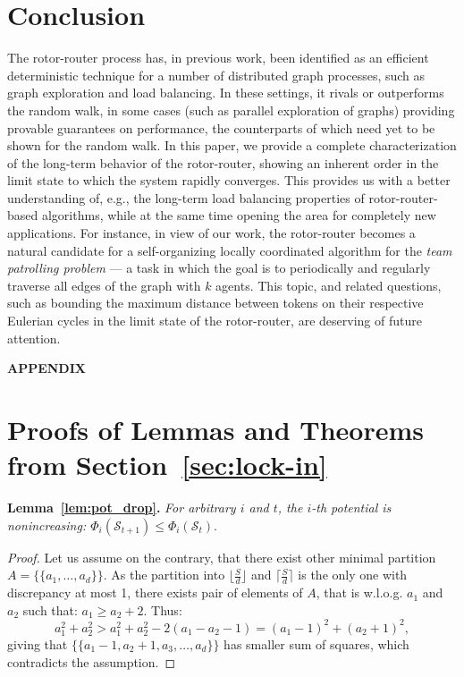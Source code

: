 \documentclass{article}[11pt,letter]
\newcommand{\state}{\mathcal{S}}
\newcommand{\mset}[1]{\{\!\{#1\}\!\}}
\begin{document}
\section{Conclusion}

The rotor-router process has, in previous work, been identified as an efficient deterministic technique for a number of distributed graph processes, such as graph exploration and load balancing. In these settings, it rivals or outperforms the random walk, in some cases (such as parallel exploration of graphs) providing provable guarantees on performance, the counterparts of which need yet to be shown for the random walk. In this paper, we provide a complete characterization of the long-term behavior of the rotor-router, showing an inherent order in the limit state to which the system rapidly converges. This provides us with a better understanding of, e.g., the long-term load balancing properties of rotor-router-based algorithms, while at the same time opening the area for completely new applications. For instance, in view of our work, the rotor-router becomes a natural candidate for a self-organizing locally coordinated algorithm for the \emph{team patrolling problem} --- a task in which the goal is to periodically and regularly traverse all edges of the graph with $k$ agents. This topic, and related questions, such as bounding the maximum distance between tokens on their respective Eulerian cycles in the limit state of the rotor-router, are deserving of future attention.

\newpage
{}

\newpage
\appendix
\begin{center} \large{ \textbf{APPENDIX} } \end{center}

\section{Proofs of Lemmas and Theorems from Section~\ref{sec:lock-in}}








\noindent\textbf{Lemma~\ref{lem:pot_drop}.}
\emph{For arbitrary $i$ and $t$, the $i$-th potential is nonincreasing: $\Phi_{i}(\state_{t+1}) \le \Phi_{i}(\state_{t}).$}
\begin{proof}
Let us assume on the contrary, that there exist other minimal partition $A=\mset{a_1,\ldots,a_d}$.
As the partition into $\lfloor\frac{S}{d}\rfloor$ and $\lceil\frac{S}{d}\rceil$ is the only one with discrepancy at most 1, there exists pair of elements of $A$, that is w.l.o.g. $a_1$ and $a_2$ such that: $a_1 \ge a_2+2$.
Thus:
$$a_1^2 + a_2^2 > a_1^2 + a_2^2 - 2(a_1-a_2-1)  = (a_1-1)^2 + (a_2+1)^2,$$
giving that $\mset{ a_1-1, a_2+1, a_3, \ldots, a_d}$ has smaller sum of squares, which contradicts the assumption.
\end{proof}
\end{document}
